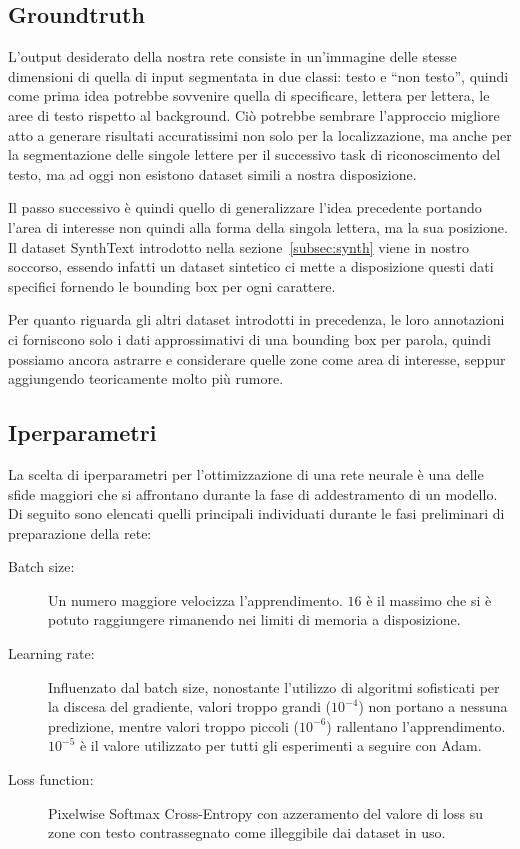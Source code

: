 \subsection{Groundtruth}
L'output desiderato della nostra rete consiste in un'immagine delle stesse dimensioni di quella di input segmentata in due classi: testo e ``non testo'', quindi come prima idea potrebbe sovvenire quella di specificare, lettera per lettera, le aree di testo rispetto al background. Ciò potrebbe sembrare l'approccio migliore atto a generare risultati accuratissimi non solo per la localizzazione, ma anche per la segmentazione delle singole lettere per il successivo task di riconoscimento del testo, ma ad oggi non esistono dataset simili a nostra disposizione.\par
Il passo successivo è quindi quello di generalizzare l'idea precedente portando l'area di interesse non quindi alla forma della singola lettera, ma la sua posizione. Il dataset SynthText introdotto nella sezione~\ref{subsec:synth} viene in nostro soccorso, essendo infatti un dataset sintetico ci mette a disposizione questi dati specifici fornendo le bounding box per ogni carattere.\par
Per quanto riguarda gli altri dataset introdotti in precedenza, le loro annotazioni ci forniscono solo i dati approssimativi di una bounding box per parola, quindi possiamo ancora astrarre e considerare quelle zone come area di interesse, seppur aggiungendo teoricamente molto più rumore.\par


\subsection{Iperparametri}
La scelta di iperparametri per l'ottimizzazione di una rete neurale è una delle sfide maggiori che si affrontano durante la fase di addestramento di un modello. Di seguito sono elencati quelli principali individuati durante le fasi preliminari di preparazione della rete:
\begin{description}
	\item[Batch size:]
		Un numero maggiore velocizza l'apprendimento. $16$ è il massimo che si è potuto raggiungere rimanendo nei limiti di memoria a disposizione.
	\item[Learning rate:]
		Influenzato dal batch size, nonostante l'utilizzo di algoritmi sofisticati per la discesa del gradiente, valori troppo grandi ($10^{-4}$) non portano a nessuna predizione, mentre valori troppo piccoli ($10^{-6}$) rallentano l'apprendimento. $10^{-5}$ è il valore utilizzato per tutti gli esperimenti a seguire con Adam.
	\item[Loss function:]
		Pixelwise Softmax Cross-Entropy con azzeramento del valore di loss su zone con testo contrassegnato come illeggibile dai dataset in uso.
\end{description}


